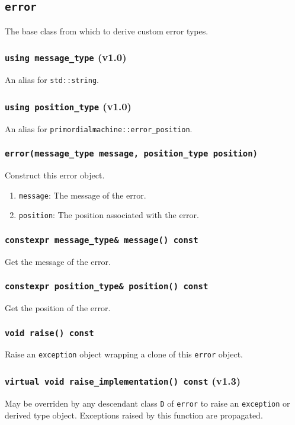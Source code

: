 \documentclass[oneside]{article}
\begin{document}
\subsection{\texttt{error}}
The base class from which to derive custom error types.

\subsubsection{\texttt{using message\_type} (v1.0)}
An alias for \texttt{std::string}.

\subsubsection{\texttt{using position\_type} (v1.0)}
An alias for \texttt{primordialmachine::error\_position}.

\subsubsection{\texttt{error(message\_type message, position\_type position)}}
Construct this error object.
\begin{enumerate}
	\item\texttt{message}: The message of the error.
	\item\texttt{position}: The position associated with the error.
\end{enumerate}

\subsubsection{\texttt{constexpr message\_type\& message() const}}
Get the message of the error.

\subsubsection{\texttt{constexpr position\_type\& position() const}}
Get the position of the error.

\subsubsection{\texttt{void raise() const}}
Raise an \texttt{exception} object wrapping a clone of this \texttt{error} object.

\subsubsection{\texttt{virtual void raise\_implementation() const} (v1.3)}
May be overriden by any descendant class \texttt{D} of \texttt{error} to raise an
\texttt{exception} or derived type object.
Exceptions raised by this function are propagated.
\end{document}

